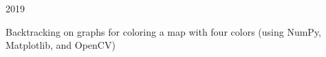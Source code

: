 \begin{cvprojects}

  \cvproject
    {} %
    {} %
    {} %
    {2019} %
    {
      \begin{cvitems} %
        \item {Backtracking on graphs for coloring a map with four colors (using NumPy, Matplotlib, and OpenCV)}
      \end{cvitems}
    }





\end{cvprojects}
